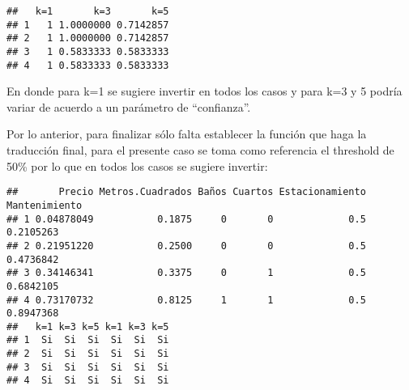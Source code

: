 \documentclass[]{article}
\newenvironment{Shaded}{\begin{snugshade}}{\end{snugshade}}
\newcommand{\KeywordTok}[1]{\textcolor[rgb]{0.13,0.29,0.53}{\textbf{#1}}}
\newcommand{\DecValTok}[1]{\textcolor[rgb]{0.00,0.00,0.81}{#1}}
\newcommand{\StringTok}[1]{\textcolor[rgb]{0.31,0.60,0.02}{#1}}
\newcommand{\OtherTok}[1]{\textcolor[rgb]{0.56,0.35,0.01}{#1}}
\newcommand{\OperatorTok}[1]{\textcolor[rgb]{0.81,0.36,0.00}{\textbf{#1}}}
\newcommand{\NormalTok}[1]{#1}
\begin{document}
\begin{verbatim}
##   k=1       k=3       k=5
## 1   1 1.0000000 0.7142857
## 2   1 1.0000000 0.7142857
## 3   1 0.5833333 0.5833333
## 4   1 0.5833333 0.5833333
\end{verbatim}

En donde para k=1 se sugiere invertir en todos los casos y para k=3 y 5
podría variar de acuerdo a un parámetro de ``confianza''.

Por lo anterior, para finalizar sólo falta establecer la función que
haga la traducción final, para el presente caso se toma como referencia
el threshold de 50\% por lo que en todos los casos se sugiere invertir:

\begin{Shaded}
\end{Shaded}

\begin{verbatim}
##       Precio Metros.Cuadrados Baños Cuartos Estacionamiento Mantenimiento
## 1 0.04878049           0.1875     0       0             0.5     0.2105263
## 2 0.21951220           0.2500     0       0             0.5     0.4736842
## 3 0.34146341           0.3375     0       1             0.5     0.6842105
## 4 0.73170732           0.8125     1       1             0.5     0.8947368
##   k=1 k=3 k=5 k=1 k=3 k=5
## 1  Si  Si  Si  Si  Si  Si
## 2  Si  Si  Si  Si  Si  Si
## 3  Si  Si  Si  Si  Si  Si
## 4  Si  Si  Si  Si  Si  Si
\end{verbatim}
\end{document}
